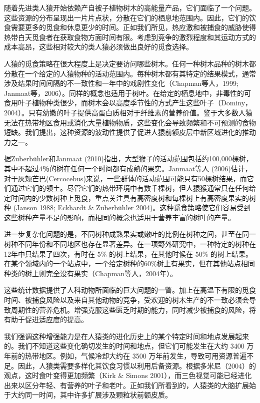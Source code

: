 随着先进类人猿开始依赖产自被子植物树木的高能量产品，它们面临了一个问题。这些资源的分布呈现出一片片点状，分散在它们的栖息地范围内。因此，它们的饮食需要更多的觅食和休息更少的时间。正如我们所见，热应激和被捕食的威胁使得热带白天觅食者在获取食物方面时间有限。考虑到竞争的激烈程度和其运动方式的成本高昂，这些相对较大的类人猿必须做出良好的觅食选择。

人猿的觅食策略在很大程度上是决定要访问哪些树木。任何一种树木品种的树木都分散在一个给定的人猿物种的活动范围内。每种树木都有其特定的结果模式，通常涉及结果时间间隔的不一致性和一年中的戏剧性变化（Chapman等人，1999; Janmaat等，2006）。同样的概念也适用于树叶。在给定的栖息地中，非毒性的可食用叶子植物种类很少，而树木会以高度季节性的方式产生这些叶子（Dominy，2004）。只有幼嫩的叶子提供高蛋白质相对于纤维素的营养价值。鉴于大多数人猿无法在热带地区食用或消化大量植物物质，这些变化会导致频繁和不可预测的食物短缺。我们提出，这种资源的波动性提供了促进人猿前额皮层中新区域进化的推动力之一。

据Zuberbühler和Janmaat (2010)指出，大型猴子的活动范围包括约100,000棵树，其中不超过4％的树在任何一个时间都有成熟的果实。Janmaat等人 (2006)估计，对于灰颊芒巴(Cercocebus)来说，一些群体的活动范围可能只有50棵树结果，而它们通过它们的领土。尽管它们的热带环境中有数千棵树，但人猿猴通常只在任何给定时间内的少数树种上觅食，重点关注具有高密度树和每棵树上有高密度果实的树种 (Janson 1988; Eckhardt \& Zuberbühler 2004)。这种觅食策略使它们容易受到这些树种产量不足的影响，而相同的概念也适用于营养丰富的树叶的产量。

进一步复杂化问题的是，不同树种成熟果实或嫩叶的比例在树种之间，甚至在同一树种不同年份和不同地区也存在显著差异。在一项野外研究中，一种特定的树种在12年中只结果了四次，有时在 5\% 的树上结果，在其他时候在 50\% 的树上结果。在某个领域内的一个站点中，一个给定树种的60\%树上有果实，但在其他站点相同种类的树上则完全没有果实（Chapman等人，2004年）。

这些统计数据提供了人科动物所面临的巨大问题的一瞥。加上在高温下有限的觅食时间、被捕食风险以及来自其他动物的竞争，受欢迎的树木生产的不一致必须会导致周期性的营养危机。增强克服这些匮乏时期的能力，同时减少被捕食的风险，将有助于促进适应度的提高。

我们强调这种增强能力是在人猿类的进化历史上的某个特定时间和地点发展起来的。我们不知道这些变化确切发生的时间和地点，但它们可能发生在大约 3400 万年前的热带地区。例如，气候冷却大约在 3500 万年前发生，导致可用资源普遍不足。因此，人猿类需要多样化其饮食习惯以利用后备资源。根据多米尼（2004）的观点，这时食叶变得更加频繁（Kirk \& Simons 2001），而三色视觉可能已经进化出来以区分年轻、有营养的叶子和老叶。正如我们所看到的，人猿类的大脑扩展始于大约同一时间，其中许多扩展涉及颗粒状前额皮质。


